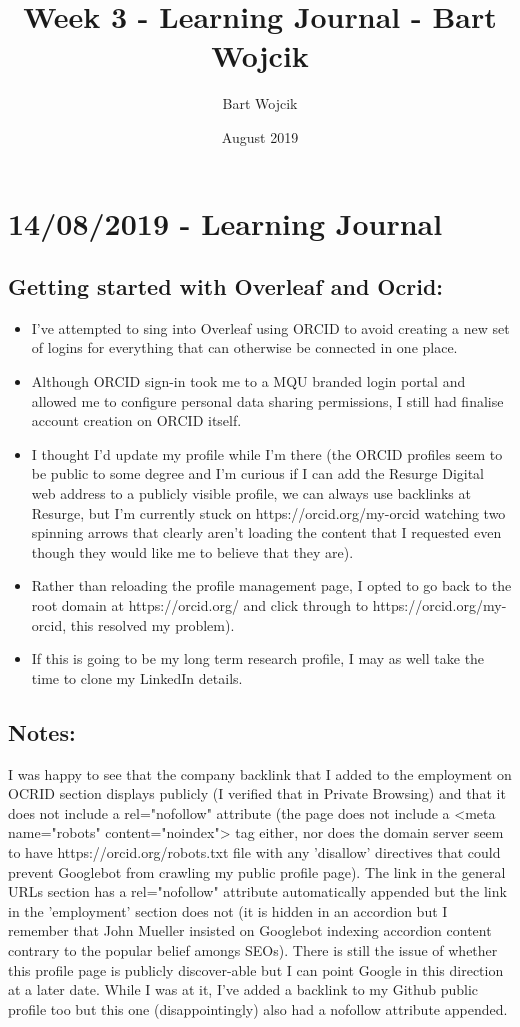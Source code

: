 \documentclass{article}
\title{Week 3 - Learning Journal - Bart Wojcik}
\author{Bart Wojcik}
\date{August 2019}
\begin{document}
\maketitle

\section{14/08/2019 - Learning Journal}
\subsection{Getting started with Overleaf and Ocrid:}
\medskip
\begin{itemize}
    \item I've attempted to sing into Overleaf using ORCID to avoid creating a new set of logins for everything that can otherwise be connected in one place.
    \item Although ORCID sign-in took me to a MQU branded login portal and allowed me to configure personal data sharing permissions, I still had finalise account creation on ORCID itself. 
    \item I thought I'd update my profile while I'm there (the ORCID profiles seem to be public to some degree and I'm curious if I can add the Resurge Digital web address to a publicly visible profile, we can always use backlinks at Resurge, but I'm currently stuck on https://orcid.org/my-orcid watching two spinning arrows that clearly aren't loading the content that I requested even though they would like me to believe that they are). 
    \item Rather than reloading the profile management page, I opted to go back to the root domain at https://orcid.org/ and click through to https://orcid.org/my-orcid, this resolved my problem). 
    \item If this is going to be my long term research profile, I may as well take the time to clone my LinkedIn details. 
\end{itemize}
\subsection{Notes:}
I was happy to see that the company backlink that I added to the employment on OCRID section displays publicly (I verified that in Private Browsing) and that it does not include a rel="nofollow" attribute (the page does not include a <meta name="robots" content="noindex"> tag either, nor does the domain server seem to have https://orcid.org/robots.txt file with any 'disallow' directives that could prevent Googlebot from crawling my public profile page). The link in the general URLs section has a rel="nofollow" attribute automatically appended but the link in the 'employment' section does not (it is hidden in an accordion but I remember that John Mueller insisted on Googlebot indexing accordion content contrary to the popular belief amongs SEOs). There is still the issue of whether this profile page is publicly discover-able but I can point Google in this direction at a later date. While I was at it, I've added a backlink to my Github public profile too but this one (disappointingly) also had a nofollow attribute appended.
\end{document}
